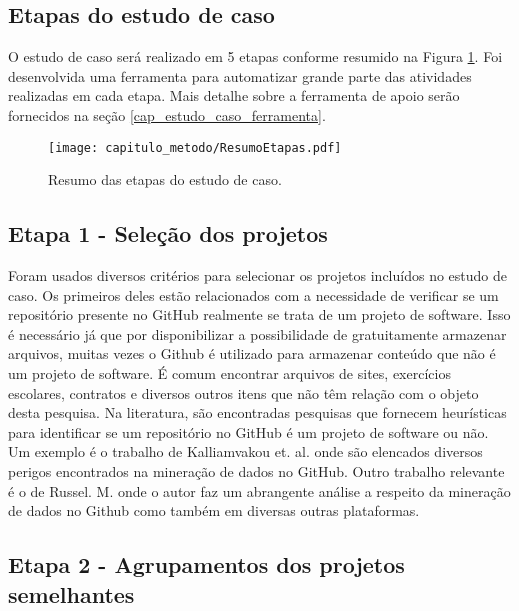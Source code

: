 \subsection{Etapas do estudo de caso}



 O estudo de caso será realizado em 5 etapas conforme resumido na  Figura \ref{fig:cap_metodo_resumo_etapas}.  Foi desenvolvida  uma ferramenta para automatizar grande parte das atividades realizadas em cada etapa. Mais detalhe sobre a ferramenta de apoio serão fornecidos na seção \ref{cap_estudo_caso_ferramenta}. 
 
\label{sec:Passos_Elaboracao_Modelo}

  \begin{figure}[H]
  \centering
  \texttt{[image: capitulo\_metodo/ResumoEtapas.pdf]} 
  \caption{Resumo das etapas do estudo de caso. }
  \label{fig:cap_metodo_resumo_etapas} 
\end{figure}

\subsection{Etapa 1 - Seleção dos projetos} 


Foram usados diversos critérios para selecionar os projetos incluídos no estudo de caso. Os primeiros deles estão relacionados com a necessidade de verificar se um repositório presente no GitHub realmente se trata de um projeto de software. Isso é necessário já que por disponibilizar a possibilidade de gratuitamente armazenar arquivos, muitas vezes o Github é utilizado para armazenar conteúdo que não é um projeto de software. É comum encontrar arquivos de sites, exercícios escolares, contratos e diversos outros itens que não têm relação com o objeto desta pesquisa. Na literatura, são encontradas pesquisas que fornecem heurísticas para identificar se um repositório no GitHub é um projeto de software ou não. Um exemplo é  o trabalho de Kalliamvakou et. al.\cite{kalliamvakou2014promises} onde são elencados diversos perigos encontrados na mineração de dados no GitHub. Outro trabalho relevante é o de Russel. M.\cite{russell2013mining} onde o autor faz um abrangente análise a respeito da mineração de dados no Github como também em diversas outras plataformas. 


\subsection{Etapa 2 - Agrupamentos dos projetos semelhantes}

